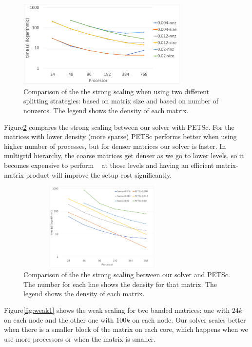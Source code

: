 \begin{figure}[tbh]
 \centering
 \includegraphics[width=8.5cm,height=4.4cm]{./figures/strong_size_vs_nnz.pdf}
 \caption{Comparison of the the strong scaling when using two different splitting strategies: based on matrix size and based on number of nonzeros. The legend shows the density of each matrix.}
 \label{fig:size_vs_nnz}
\end{figure}

Figure\ref{fig:petsc1} compares the strong scaling between our solver with PETSc. For the matrices with lower density (more sparse) PETSc performs better when using higher number of processes, but for denser matrices our solver is faster. In multigrid hierarchy, the coarse matrices get denser as we go to lower levels, so it becomes expensive to perform \mm~ at those levels and having an efficient matrix-matrix product will improve the setup cost significantly.

\begin{figure}[tbh]
 \centering
 \includegraphics[width=8.5cm,height=4.4cm]{./figures/strong_size_vs_petsc.pdf}
 \caption{Comparison of the the strong scaling between our solver and PETSc. The number for each line shows the density for that matrix. The legend shows the density of each matrix.}
 \label{fig:petsc1}
\end{figure}

Figure\ref{fig:weak1} shows the weak scaling for two banded matrices: one with $24k$ on each node and the other one with $100k$ on each node. Our solver scales better when there is a smaller block of the matrix on each core, which happens when we use more processors or when the matrix is smaller.

